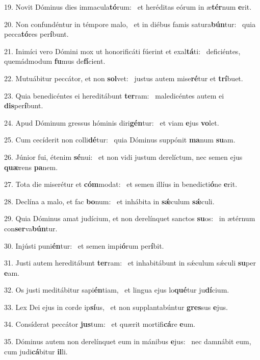 19. Novit Dóminus dies immacula\textbf{tó}rum: \ast\  et heréditas eórum in æ\textbf{tér}num \textbf{e}rit.\

20. Non confundéntur in témpore malo, \dag\  et in diébus famis satura\textbf{bún}tur: \ast\  quia pecca\textbf{tó}res per\textbf{í}bunt.\

21. Inimíci vero Dómini mox ut honorificáti fúerint et exal\textbf{tá}ti: \ast\  deficiéntes, quemádmodum \textbf{fu}mus de\textbf{fí}cient.\

22. Mutuábitur peccátor, et non \textbf{sol}vet: \ast\  justus autem mise\textbf{ré}tur et \textbf{trí}buet.\

23. Quia benedicéntes ei hereditábunt \textbf{ter}ram: \ast\  maledicéntes autem ei \textbf{dis}per\textbf{í}bunt.\

24. Apud Dóminum gressus hóminis diri\textbf{gén}tur: \ast\  et viam \textbf{e}jus \textbf{vo}let.\

25. Cum cecíderit non colli\textbf{dé}tur: \ast\  quia Dóminus suppónit \textbf{ma}num \textbf{su}am.\

26. Júnior fui, étenim \textbf{sé}nui: \ast\  et non vidi justum derelíctum, nec semen ejus \textbf{quæ}rens \textbf{pa}nem.\

27. Tota die miserétur et \textbf{cóm}modat: \ast\  et semen illíus in benedicti\textbf{ó}ne \textbf{e}rit.\

28. Declína a malo, et fac \textbf{bo}num: \ast\  et inhábita in \textbf{sǽ}culum \textbf{sǽ}culi.\

29. Quia Dóminus amat judícium, et non derelínquet sanctos \textbf{su}os: \ast\  in ætérnum con\textbf{ser}va\textbf{bún}tur.\

30. Injústi puni\textbf{én}tur: \ast\  et semen impi\textbf{ó}rum per\textbf{í}bit.\

31. Justi autem hereditábunt \textbf{ter}ram: \ast\  et inhabitábunt in sǽculum sǽculi \textbf{su}per \textbf{e}am.\

32. Os justi meditábitur sapi\textbf{én}tiam, \ast\  et lingua ejus lo\textbf{qué}tur ju\textbf{dí}cium.\

33. Lex Dei ejus in corde ip\textbf{sí}us, \ast\  et non supplantabúntur \textbf{gres}sus \textbf{e}jus.\

34. Consíderat peccátor \textbf{jus}tum: \ast\  et quærit mortifi\textbf{cá}re \textbf{e}um.\

35. Dóminus autem non derelínquet eum in mánibus \textbf{e}jus: \ast\  nec damnábit eum, cum judi\textbf{cá}bitur \textbf{il}li.\

